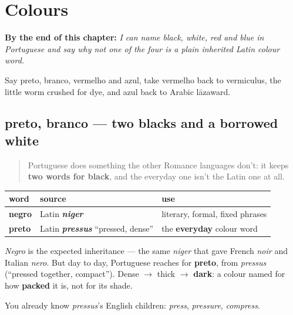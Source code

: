 
\chapter{Colours}
\label{ch:pt-colours}

\begin{chapteropening}
\textbf{By the end of this chapter:} \emph{I can name black, white, red and blue in Portuguese and say why not one of the four is a plain inherited Latin colour word.}

Say preto, branco, vermelho and azul, take vermelho back to vermiculus, the little worm crushed for dye, and azul back to Arabic lāzaward.
\end{chapteropening}

\section[preto, branco]{preto, branco — two blacks and a borrowed white}

\label{lesson:PT-C13-preto-branco}



\begin{quote}
Portuguese does something the other Romance languages don't: it keeps \textbf{two words for black}, and the everyday one isn't the Latin one at all.
\end{quote}

\begin{cousinweb}
\noindent
\begin{tabularx}{\linewidth}{@{}>{\raggedright\arraybackslash}X>{\raggedright\arraybackslash}X>{\raggedright\arraybackslash}X@{}}
\toprule
\textbf{word} & \textbf{source} & \textbf{use} \\
\midrule
\textbf{negro} & Latin \emph{\textbf{niger}} & literary, formal, fixed phrases \\
\textbf{preto} & Latin \emph{\textbf{pressus}} \textquotedblleft{}pressed, dense\textquotedblright{} & the \textbf{everyday} colour word \\
\bottomrule
\end{tabularx}

\emph{Negro} is the expected inheritance — the same \emph{niger} that gave French \emph{noir} and Italian \emph{nero}. But day to day, Portuguese reaches for \textbf{preto}, from \emph{pressus} (\textquotedblleft{}pressed together, compact\textquotedblright{}). Dense $\to$ thick $\to$ \textbf{dark}: a colour named for how \textbf{packed} it is, not for its shade.

You already know \emph{pressus}'s English children: \emph{press}, \emph{pressure}, \emph{compress}.
\end{cousinweb}

